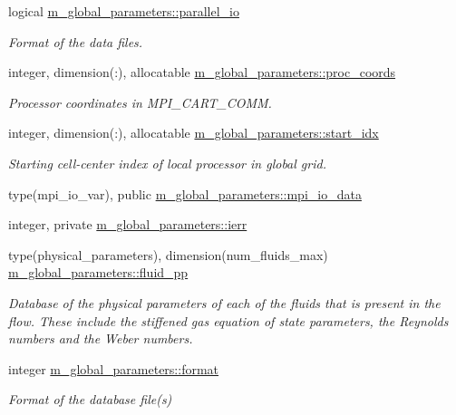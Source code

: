 \begin{DoxyCompactItemize}
logical \hyperlink{namespacem__global__parameters_ac127ac2a9036e1cdb7e6c41159cacdfb}{m\+\_\+global\+\_\+parameters\+::parallel\+\_\+io}
\begin{DoxyCompactList}\small\item\em Format of the data files. \end{DoxyCompactList}\item 
integer, dimension(\+:), allocatable \hyperlink{namespacem__global__parameters_a48dea2bc17c5e4465a444c926070ae9b}{m\+\_\+global\+\_\+parameters\+::proc\+\_\+coords}
\begin{DoxyCompactList}\small\item\em Processor coordinates in M\+P\+I\+\_\+\+C\+A\+R\+T\+\_\+\+C\+O\+MM. \end{DoxyCompactList}\item 
integer, dimension(\+:), allocatable \hyperlink{namespacem__global__parameters_a4bd117ae744eab60f3d681fd03d6e90d}{m\+\_\+global\+\_\+parameters\+::start\+\_\+idx}
\begin{DoxyCompactList}\small\item\em Starting cell-\/center index of local processor in global grid. \end{DoxyCompactList}\item 
type(mpi\+\_\+io\+\_\+var), public \hyperlink{namespacem__global__parameters_ad80f68aac31aa898ab2d7729f60e375f}{m\+\_\+global\+\_\+parameters\+::mpi\+\_\+io\+\_\+data}
\item 
integer, private \hyperlink{namespacem__global__parameters_a46461347b5094736adfa94ef005b49a6}{m\+\_\+global\+\_\+parameters\+::ierr}
\item 
type(physical\+\_\+parameters), dimension(num\+\_\+fluids\+\_\+max) \hyperlink{namespacem__global__parameters_a7297abec8863ecabf95e24ebdae46a17}{m\+\_\+global\+\_\+parameters\+::fluid\+\_\+pp}
\begin{DoxyCompactList}\small\item\em Database of the physical parameters of each of the fluids that is present in the flow. These include the stiffened gas equation of state parameters, the Reynolds numbers and the Weber numbers. \end{DoxyCompactList}\item 
integer \hyperlink{namespacem__global__parameters_a35560eae3e70f3a803a78c590bce1e13}{m\+\_\+global\+\_\+parameters\+::format}
\begin{DoxyCompactList}\small\item\em Format of the database file(s) \end{DoxyCompactList}\item 

\end{DoxyCompactItemize}
